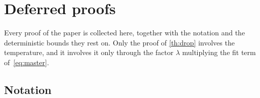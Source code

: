 \section{Deferred proofs}
\label{sec:app}


Every proof of the paper is collected here, together with the notation and
the deterministic bounds they rest on. Only the proof of \cref{th:drop}
involves the temperature, and it involves it only through the factor
$\lambda$ multiplying the fit term of~\eqref{eq:master}.

\subsection{Notation}
\label{sec:prelim}

